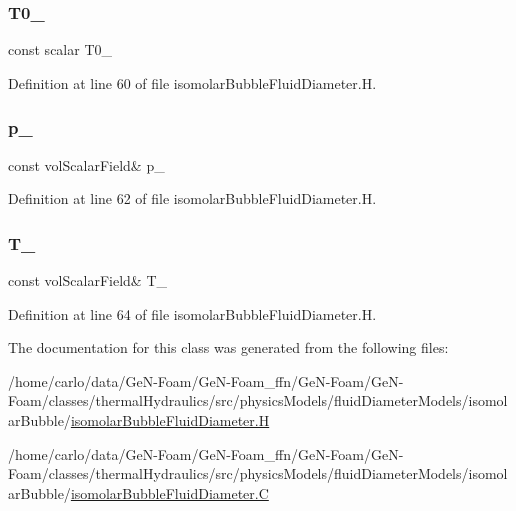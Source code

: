 \subsubsection{\texorpdfstring{T0\+\_\+}{T0\_}}
{\footnotesize\ttfamily const scalar T0\+\_\+\hspace{0.3cm}{\ttfamily [protected]}}



Definition at line 60 of file isomolar\+Bubble\+Fluid\+Diameter.\+H.

\mbox{\label{classFoam_1_1fluidDiameterModels_1_1isomolarBubble_a4c9ce31e482786bbeeed352570fd8d09}} 
\subsubsection{\texorpdfstring{p\+\_\+}{p\_}}
{\footnotesize\ttfamily const vol\+Scalar\+Field\& p\+\_\+\hspace{0.3cm}{\ttfamily [protected]}}



Definition at line 62 of file isomolar\+Bubble\+Fluid\+Diameter.\+H.

\mbox{\label{classFoam_1_1fluidDiameterModels_1_1isomolarBubble_ad77990330c1ea76d80703ca99150f7cc}} 
\subsubsection{\texorpdfstring{T\+\_\+}{T\_}}
{\footnotesize\ttfamily const vol\+Scalar\+Field\& T\+\_\+\hspace{0.3cm}{\ttfamily [protected]}}



Definition at line 64 of file isomolar\+Bubble\+Fluid\+Diameter.\+H.



The documentation for this class was generated from the following files\+:\begin{DoxyCompactItemize}
\item 
/home/carlo/data/\+Ge\+N-\/\+Foam/\+Ge\+N-\/\+Foam\+\_\+ffn/\+Ge\+N-\/\+Foam/\+Ge\+N-\/\+Foam/classes/thermal\+Hydraulics/src/physics\+Models/fluid\+Diameter\+Models/isomolar\+Bubble/\hyperlink{isomolarBubbleFluidDiameter_8H}{isomolar\+Bubble\+Fluid\+Diameter.\+H}\item 
/home/carlo/data/\+Ge\+N-\/\+Foam/\+Ge\+N-\/\+Foam\+\_\+ffn/\+Ge\+N-\/\+Foam/\+Ge\+N-\/\+Foam/classes/thermal\+Hydraulics/src/physics\+Models/fluid\+Diameter\+Models/isomolar\+Bubble/\hyperlink{isomolarBubbleFluidDiameter_8C}{isomolar\+Bubble\+Fluid\+Diameter.\+C}\end{DoxyCompactItemize}
